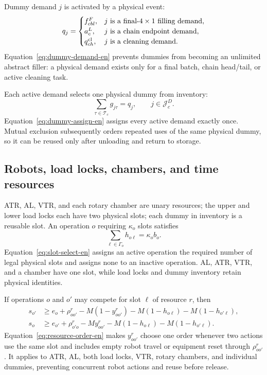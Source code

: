 \documentclass[journal]{IEEEtran}
\begin{document}
Dummy demand $j$ is activated by a physical event:
\begin{equation}
q_j=
\begin{cases}
f^F_{cbl},&j\text{ is a final-$4\times1$ filling demand},\\
a^L_c,&j\text{ is a chain endpoint demand},\\
q^{\rm cl}_{ch},&j\text{ is a cleaning demand}.
\end{cases}
\label{eq:dummy-demand-en}
\end{equation}
Equation~\eqref{eq:dummy-demand-en} prevents dummies from becoming an unlimited abstract filler: a physical demand exists only for a final batch, chain head/tail, or active cleaning task.

Each active demand selects one physical dummy from inventory:
\begin{equation}
\sum_{\tau\in\mathcal T_c}g_{j\tau}=q_j,
\qquad j\in\mathcal J_c^D.
\label{eq:dummy-assign-en}
\end{equation}
Equation~\eqref{eq:dummy-assign-en} assigns every active demand exactly once. Mutual exclusion subsequently orders repeated uses of the same physical dummy, so it can be reused only after unloading and return to storage.

\subsection{Robots, load locks, chambers, and time resources}

ATR, AL, VTR, and each rotary chamber are unary resources; the upper and lower load locks each have two physical slots; each dummy in inventory is a reusable slot. An operation $o$ requiring $\kappa_o$ slots satisfies
\begin{equation}
\sum_{\ell\in\Gamma_o}h_{o\ell}=\kappa_ob_o.
\label{eq:slot-select-en}
\end{equation}
Equation~\eqref{eq:slot-select-en} assigns an active operation the required number of legal physical slots and assigns none to an inactive operation. AL, ATR, VTR, and a chamber have one slot, while load locks and dummy inventory retain physical identities.

If operations $o$ and $o'$ may compete for slot $\ell$ of resource $r$, then
\begin{equation}
\begin{aligned}
s_{o'}&\ge e_o+\rho^r_{oo'}-M(1-y^r_{oo'})
-M(1-h_{o\ell})-M(1-h_{o'\ell}),\\
s_o&\ge e_{o'}+\rho^r_{o'o}-My^r_{oo'}
-M(1-h_{o\ell})-M(1-h_{o'\ell}).
\end{aligned}
\label{eq:resource-order-en}
\end{equation}
Equation~\eqref{eq:resource-order-en} makes $y^r_{oo'}$ choose one order whenever two actions use the same slot and includes empty robot travel or equipment reset through $\rho^r_{oo'}$. It applies to ATR, AL, both load locks, VTR, rotary chambers, and individual dummies, preventing concurrent robot actions and reuse before release.
\end{document}
